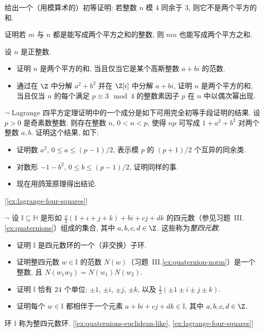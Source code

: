 \begin{prob}
\label{ex:mod4-not-sum-squares}
给出一个（用模算术的）初等证明: 若整数 $n$ 模 $4$ 同余于 $3$, 则它不是两个平方的和.
\end{prob}

\begin{prob}
\label{ex:product-sum-squares}
证明若 $m$ 与 $n$ 都是能写成两个平方之和的整数, 则 $mn$ 也能写成两个平方之和.
\end{prob}

\begin{prob}
\label{ex:sum-squares-norm-prime}
设 $n$ 是正整数.
\begin{itemize}
\item 证明 $n$ 是两个平方的和, 当且仅当它是某个高斯整数 $a+bi$ 的范数.
\item 通过在 $\Z$ 中分解 $a^2+b^2$ 并在 $\Z[i]$ 中分解 $a+bi$, 证明 $n$ 是两个平方的和, 当且仅当 $n$ 的每个满足 $p\equiv 3\mod 4$ 的整数素因子 $p$ 在 $n$ 中以偶次幂出现.
\end{itemize}
\end{prob}

\begin{prob}
\label{ex:four-squares-lemma}
$\neg$ Lagrange 四平方定理证明中的一个成分是如下可用完全初等手段证明的结果. 设 $p>0$ 是奇素数整数. 则存在整数 $n$, $0<n<p$, 使得 $np$ 可写成 $1+a^2+b^2$ 对两个整数 $a,b$. 证明这个结果, 如下:
\begin{itemize}
\item 证明数 $a^2$, $0\leq a\leq (p-1)/2$, 表示模 $p$ 的 $(p+1)/2$ 个互异的同余类.
\item 对数形 $-1-b^2$, $0\leq b\leq (p-1)/2$, 证明同样的事.
\item 现在用鸽笼原理得出结论.
\end{itemize} [\ref{ex:lagrange-four-squares}]
\end{prob}

\begin{prob}
\label{ex:integral-quaternions}
$\neg$ 设 $\mathbb{I}\subseteq\mathbb{H}$ 是形如 $\frac{a}{2}(1+i+j+k)+bi+cj+dk$ 的四元数（参见习题~III.\ref{ex:quaternions}）组成的集合, 其中 $a,b,c,d\in\Z$. 这些称为\emph{整四元数}.
\begin{itemize}
\item 证明 $\mathbb{I}$ 是四元数环的一个（非交换）子环.
\item 证明整四元数 $w\in\mathbb{I}$ 的范数 $N(w)$（习题~III.\ref{ex:quaternion-norm}）是一个整数, 且 $N(w_1w_2)=N(w_1)N(w_2)$.
\item 证明 $\mathbb{I}$ 恰有 $24$ 个单位: $\pm 1$, $\pm i$, $\pm j$, $\pm k$, 以及 $\frac{1}{2}(\pm 1\pm i\pm j\pm k)$.
\item 证明每个 $w\in\mathbb{I}$ 都相伴于一个元素 $a+bi+cj+dk\in\mathbb{I}$, 其中 $a,b,c,d\in\Z$.
\end{itemize}
环 $\mathbb{I}$ 称为整四元数环. [\ref{ex:quaternions-euclidean-like}, \ref{ex:lagrange-four-squares}]
\end{prob}

